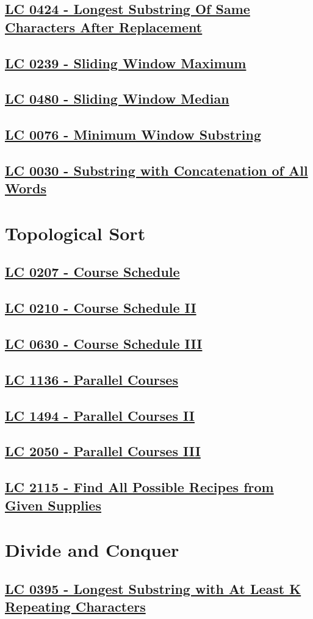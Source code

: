 \subsection{\hyperref[lc0424]{LC 0424 - Longest Substring Of Same Characters After Replacement}}
\subsection{\hyperref[lc0239]{LC 0239 - Sliding Window Maximum}}
\subsection{\hyperref[lc0480]{LC 0480 - Sliding Window Median}}
\subsection{\hyperref[lc0076]{LC 0076 - Minimum Window Substring}}
\subsection{\hyperref[lc0030]{LC 0030 - Substring with Concatenation of All Words}}

\section{Topological Sort}\label{sec:topological_sort}
\subsection{\hyperref[lc0207]{LC 0207 - Course Schedule}}
\subsection{\hyperref[lc0210]{LC 0210 - Course Schedule II}}
\subsection{\hyperref[lc0630]{LC 0630 - Course Schedule III}}
\subsection{\hyperref[lc1136]{LC 1136 - Parallel Courses}}
\subsection{\hyperref[lc1494]{LC 1494 - Parallel Courses II}}
\subsection{\hyperref[lc2050]{LC 2050 - Parallel Courses III}}
\subsection{\hyperref[lc2115]{LC 2115 - Find All Possible Recipes from Given Supplies}}

\section{Divide and Conquer}\label{sec:divide_and_conquer}
\subsection{\hyperref[lc0395]{LC 0395 - Longest Substring with At Least K Repeating Characters}}